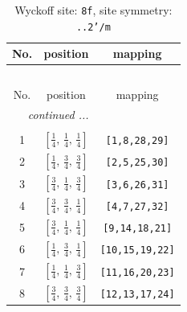\documentclass[fleqn,8pt]{jsarticle}
\begin{document}
\begin{longtable}{ccc}
\caption{Wyckoff site: {\tt 8f}, site symmetry: {\tt ..2'/m}}
 \\
 \hline \hline
No. & position & mapping \\ \hline \endfirsthead

\multicolumn{2}{l}{\tablename\ \thetable{}} \\
 \hline \hline
No. & position & mapping \\ \hline \endhead

 \hline \hline
\multicolumn{2}{r}{\footnotesize\it continued ...} \\ \endfoot

 \hline \hline
\multicolumn{2}{r}{} \\ \endlastfoot

1 & $\left[ \frac{1}{4},\, \frac{1}{4},\, \frac{1}{4} \right]$ & {\tt [1,8,28,29]} \\ \hline
2 & $\left[ \frac{1}{4},\, \frac{3}{4},\, \frac{3}{4} \right]$ & {\tt [2,5,25,30]} \\ \hline
3 & $\left[ \frac{3}{4},\, \frac{1}{4},\, \frac{3}{4} \right]$ & {\tt [3,6,26,31]} \\ \hline
4 & $\left[ \frac{3}{4},\, \frac{3}{4},\, \frac{1}{4} \right]$ & {\tt [4,7,27,32]} \\ \hline
5 & $\left[ \frac{3}{4},\, \frac{1}{4},\, \frac{1}{4} \right]$ & {\tt [9,14,18,21]} \\ \hline
6 & $\left[ \frac{1}{4},\, \frac{3}{4},\, \frac{1}{4} \right]$ & {\tt [10,15,19,22]} \\ \hline
7 & $\left[ \frac{1}{4},\, \frac{1}{4},\, \frac{3}{4} \right]$ & {\tt [11,16,20,23]} \\ \hline
8 & $\left[ \frac{3}{4},\, \frac{3}{4},\, \frac{3}{4} \right]$ & {\tt [12,13,17,24]} \\
\end{longtable}
\renewcommand{\arraystretch}{1.2}
\end{document}
